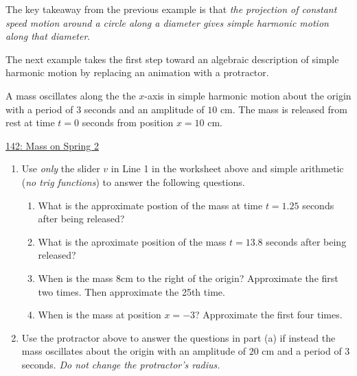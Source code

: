 \documentclass{ximera}
\begin{document}
The key takeaway from the previous example is that \emph{the projection of constant speed motion around a circle along a diameter gives simple harmonic motion along that diameter}.  

The next example takes the first step toward an algebraic description of simple harmonic motion by replacing an animation with a protractor.

\begin{example}  \label{Ex:PDoEr3rdfsx}
A mass oscillates along the the $x$-axis in simple harmonic motion  about the origin  with a period of $3$ seconds and an amplitude of $10$ cm. The mass is released from rest at time $t=0$ seconds from position $x=10$ cm.

\begin{onlineOnly}
    \begin{center}
\end{center}
\end{onlineOnly}

\href{https://www.desmos.com/calculator/rqdenajviu}{142: Mass on Spring 2 }

\begin{enumerate}

\item Use \emph{only} the slider $v$ in Line 1 in the worksheet above and simple arithmetic (\emph{no trig functions})  to answer the following questions.

\begin{enumerate}
\item What is the approximate postion of the mass at time $t=1.25$ seconds after being released?

\item What is the aproximate position of the mass $t=13.8$ seconds after being released?

\item When is the mass $8$cm to the right of the origin? Approximate the first two times. Then approximate the 25th time.

\item When is the mass  at position $x = -3$? Approximate the first four times.  
\end{enumerate}

\item Use the protractor above to answer the questions in part (a) if instead the mass oscillates about the origin with an amplitude of $20$ cm and a period of $3$ seconds. \emph{Do not change the protractor's radius.}



\end{enumerate}
\end{example}
\end{document}

